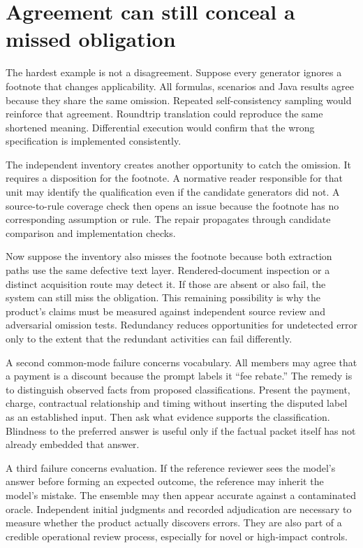 \section{Agreement can still conceal a missed obligation}
\label{merge:M06:23}


The hardest example is not a disagreement. Suppose every generator ignores a
footnote that changes applicability. All formulas, scenarios and Java results
agree because they share the same omission. Repeated self-consistency sampling
would reinforce that agreement. Roundtrip translation could reproduce the same
shortened meaning. Differential execution would confirm that the wrong
specification is implemented consistently.

The independent inventory creates another opportunity to catch the omission. It
requires a disposition for the footnote. A normative reader responsible for that
unit may identify the qualification even if the candidate generators did not.
A source-to-rule coverage check then opens an issue because the footnote has no
corresponding assumption or rule. The repair propagates through candidate
comparison and implementation checks.


Now suppose the inventory also misses the footnote because both extraction paths
use the same defective text layer. Rendered-document inspection or a distinct
acquisition route may detect it. If those are absent or also fail, the system can
still miss the obligation. This remaining possibility is why the product's
claims must be measured against independent source review and adversarial
omission tests. Redundancy reduces opportunities for undetected error only to
the extent that the redundant activities can fail differently.

A second common-mode failure concerns vocabulary. All members may agree that a
payment is a discount because the prompt labels it ``fee rebate.'' The remedy is
to distinguish observed facts from proposed classifications. Present the payment,
charge, contractual relationship and timing without inserting the disputed label
as an established input. Then ask what evidence supports the classification.
Blindness to the preferred answer is useful only if the factual packet itself
has not already embedded that answer.

A third failure concerns evaluation. If the reference reviewer sees the model's
answer before forming an expected outcome, the reference may inherit the model's
mistake. The ensemble may then appear accurate against a contaminated oracle.
Independent initial judgments and recorded adjudication are necessary to measure
whether the product actually discovers errors. They are also part of a credible
operational review process, especially for novel or high-impact controls.

